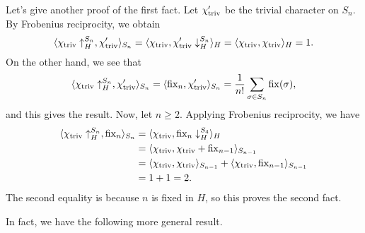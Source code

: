 Let's give another proof of the first fact. Let $\chi'_{\operatorname{triv}}$ be the trivial 
character on $S_n$. By Frobenius reciprocity, we obtain 
\[ \langle \chi_{\operatorname{triv}} \uparrow_H^{S_n}, \chi'_{\operatorname{triv}} \rangle_{S_n} 
= \langle \chi_{\operatorname{triv}}, \chi'_{\operatorname{triv}} \downarrow_H^{S_n} \rangle_H 
= \langle \chi_{\operatorname{triv}}, \chi_{\operatorname{triv}} \rangle_H = 1. \]
On the other hand, we see that 
\[ \langle \chi_{\operatorname{triv}} \uparrow_H^{S_n}, \chi'_{\operatorname{triv}} \rangle_{S_n} 
= \langle \operatorname{fix}_n, \chi'_{\operatorname{triv}} \rangle_{S_n} = \frac{1}{n!} \sum_{\sigma \in S_n} 
\operatorname{fix}(\sigma), \] 
and this gives the result. Now, let $n \geq 2$. Applying Frobenius reciprocity, 
we have 
\begin{align*}
    \langle \chi_{\operatorname{triv}} \uparrow_H^{S_n}, \operatorname{fix}_n \rangle_{S_n} 
    &= \langle \chi_{\operatorname{triv}}, \operatorname{fix}_n \downarrow_H^{S_4} \rangle_H \\ 
    &= \langle \chi_{\operatorname{triv}}, \chi_{\operatorname{triv}} + \operatorname{fix}_{n-1} \rangle_{S_{n-1}} \\ 
    &= \langle \chi_{\operatorname{triv}}, \chi_{\operatorname{triv}} \rangle_{S_{n-1}} 
    + \langle \chi_{\operatorname{triv}}, \operatorname{fix}_{n-1} \rangle_{S_{n-1}} \\ 
    &= 1 + 1 = 2. 
\end{align*}
The second equality is because $n$ is fixed in $H$, so this proves the second fact. 

In fact, we have the following more general result. 

